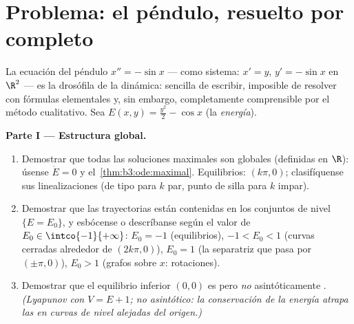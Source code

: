 \section{Problema: el péndulo, resuelto por completo}

\begin{problem}\label{pb:b3:ode:1} La ecuación del péndulo
$x'' = -\sin x$ --- como sistema: $x' =
y$, $y' = -\sin x$ en $\R^2$ --- es la drosófila de la dinámica:
sencilla de escribir, imposible de resolver con fórmulas elementales y,
sin embargo, completamente comprensible por el método cualitativo. Sea
$E(x, y) = \frac{y^2}2 - \cos x$ (la \emph{energía}).

\medskip
\noindent\textbf{Parte I --- Estructura global.}
\begin{enumerate}
  \item Demostrar que todas las soluciones
  maximales son globales (definidas en $\R$): úsense $\dot E = 0$ y
  el~\cref{thm:b3:ode:maximal}. Equilibrios: $(k\pi, 0)$; clasifíquense
  sus linealizaciones (de tipo  para $k$ par, punto de silla para
  $k$ impar). \item Demostrar que las trayectorias están contenidas en
  los conjuntos de nivel $\{E = E_0\}$, y esbócense o descríbanse según
  el valor de $E_0 \in \intco{-1}{+\infty}$: $E_0 = -1$ (equilibrios),
  $-1 < E_0 < 1$ (curvas cerradas alrededor de $(2k\pi, 0)$), $E_0 = 1$
  (la separatriz que pasa por $(\pm\pi, 0)$), $E_0 > 1$ (grafos sobre
  $x$: rotaciones). \item Demostrar que el equilibrio inferior $(0,0)$
  es  pero \emph{no}
  asintóticamente .
  \emph{(Lyapunov con $V = E + 1$; no asintótico: la conservación de la
  energía atrapa las  en curvas de
  nivel alejadas del origen.)}
\end{enumerate}


\end{problem}
